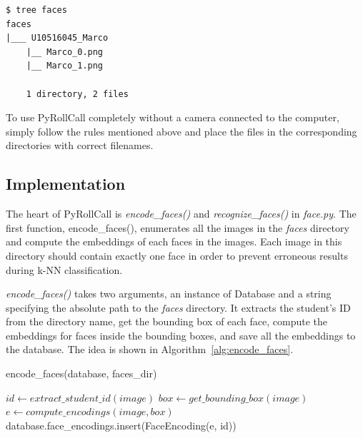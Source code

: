 \begin{lstlisting}[numbers=none,xleftmargin=0em,caption={Example hierarchy of the \emph{faces} directory.},label={lst:faces-tree-output}]
$ tree faces 
faces
|___ U10516045_Marco
    |__ Marco_0.png
    |__ Marco_1.png

    1 directory, 2 files
\end{lstlisting}
\vspace{0.2cm}

To use PyRollCall completely without a camera connected to the computer,
simply follow the rules mentioned above and place the files in the corresponding directories
with correct filenames.

\subsection{Implementation}
The heart of PyRollCall is \emph{encode\_faces()} and \emph{recognize\_faces()} in \emph{face.py}.
The first function, encode\_faces(), enumerates all the images in the \emph{faces} directory
and compute the embeddings of each faces in the images. Each image in this directory
should contain exactly one face in order to prevent erroneous results during k-NN classification.

\emph{encode\_faces()} takes two arguments, an instance of Database and a string specifying
the absolute path to the \emph{faces} directory. It extracts the student's ID from the directory name,
get the bounding box of each face, compute the embeddings for faces inside the bounding boxes,
and save all the embeddings to the database. The idea is shown in Algorithm~\ref{alg:encode_faces}.
\vspace{0.2cm}

\begin{algorithm}
  \caption{encode\_faces(database, faces\_dir)}
  \label{alg:encode_faces}
  \begin{algorithmic}
      \STATE $id \leftarrow extract\_student\_id(image)$
      \STATE $box \leftarrow get\_bounding\_box(image)$
      \STATE $e \leftarrow compute\_encodings(image, box)$
      \STATE
      \STATE database.face\_encodings.insert(FaceEncoding(e, id)) 
    \ENDFOR
  \end{algorithmic}
\end{algorithm}

